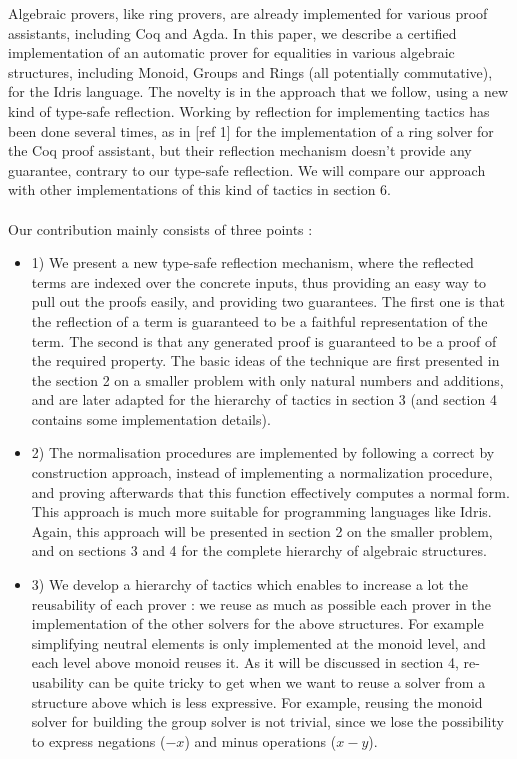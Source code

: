 Algebraic provers, like ring provers, are already implemented for various proof assistants, including Coq and Agda. In this paper, we describe a certified implementation of an automatic prover for equalities in various algebraic structures, including Monoid, Groups and Rings (all potentially commutative), for the Idris language. The novelty is in the approach that we follow, using a new kind of type-safe reflection.
Working by reflection for implementing tactics has been done several times, as in [ref 1] for the implementation of a ring solver for the Coq proof assistant, but their reflection mechanism  doesn't provide any guarantee, contrary to our type-safe reflection. We will compare our approach with other implementations of this kind of tactics in section 6. \\
\\
Our contribution mainly consists of three points :
\begin{itemize}
	\item 1) We present a new type-safe reflection mechanism, where the reflected terms are indexed over the concrete inputs, thus providing an easy way to pull out the proofs easily, and providing two guarantees. The first one is that the reflection of a term is guaranteed to be a faithful representation of the term. The second is that any generated proof is guaranteed to be a proof of the required property. The basic ideas of the technique are first presented in the section 2 on a smaller problem with only natural numbers and additions, and are later adapted for the hierarchy of tactics in section 3 (and section 4 contains some implementation details).	
	\item 2) The normalisation procedures are implemented by following a correct by construction approach, instead of implementing a normalization procedure, and proving afterwards that this function effectively computes a normal form. This approach is much more suitable for programming languages like Idris. Again, this approach will be presented in section 2 on the smaller problem, and on sections 3 and 4 for the complete hierarchy of algebraic structures.
	\item 3) We develop a hierarchy of tactics which enables to increase a lot the reusability of each prover : we reuse as much as possible each prover in the implementation of the other solvers for the above structures. For example simplifying neutral elements is only implemented at the monoid level, and each level above monoid reuses it. As it will be discussed in section 4, re-usability can be quite tricky to get when we want to reuse a solver from a structure above which is less expressive. For example, reusing the monoid solver for building the group solver is not trivial, since we lose the possibility to express negations ($-x$) and minus operations ($x-y$).
\end{itemize}